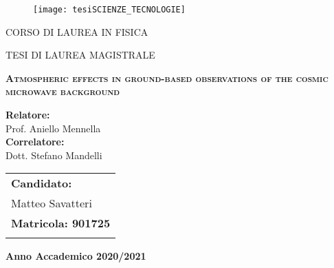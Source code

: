 
\begin{titlepage}
	
\begin{figure}
        \centering
        \texttt{[image: tesiSCIENZE\_TECNOLOGIE]}\\
	\vspace{0.5 cm}
\end{figure}

\begin{center}
        \Large{ CORSO DI LAUREA IN FISICA} 
\end{center}

\begin{center}
        \large{ TESI DI LAUREA MAGISTRALE} 
\end{center}

\begin{center}
\vspace{2 cm}

{\LARGE \textsc{\textbf{Atmospheric effects in ground-based observations of the
cosmic microwave background}}}
\end{center}

\par
\vspace{2 cm}
  
\begin{flushleft}
        \textbf{Relatore:}\\
        Prof. Aniello Mennella\\
        \noindent \textbf{Correlatore:}\\
        Dott. Stefano Mandelli
\end{flushleft}
  
\begin{flushright}
        \begin{tabular}{l@{}}
                \textbf{Candidato:}\\ Matteo Savatteri\\
                \textbf{Matricola: 901725}\\ 
                \vspace{0.5 cm}
        \end{tabular}
\end{flushright}
    	  
\vfill

\begin{center}
        {\large \textbf{Anno Accademico 2020/2021}}
\end{center}

\end{titlepage}

\restoregeometry
